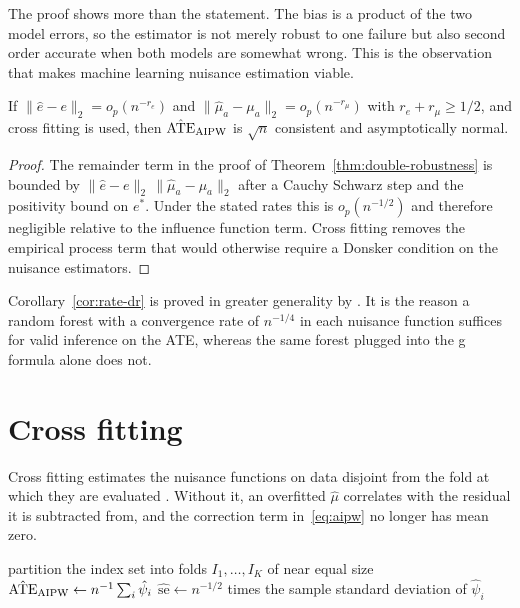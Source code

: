 The proof shows more than the statement. The bias is a product of the two model
errors, so the estimator is not merely robust to one failure but also
second order accurate when both models are somewhat wrong. This is the
observation that makes machine learning nuisance estimation viable.

\begin{corollary}
\label{cor:rate-dr}
If $\|\hat{e} - e\|_{2} = o_p(n^{-r_e})$ and
$\|\hat{\mu}_a - \mu_a\|_{2} = o_p(n^{-r_\mu})$ with $r_e + r_\mu \geq 1/2$,
and cross fitting is used, then $\hat{\mathrm{ATE}}_{\mathrm{AIPW}}$ is
$\sqrt{n}$ consistent and asymptotically normal.
\end{corollary}

\begin{proof}
The remainder term in the proof of Theorem~\ref{thm:double-robustness} is
bounded by $\|\hat{e} - e\|_{2}\,\|\hat{\mu}_a - \mu_a\|_{2}$ after a Cauchy
Schwarz step and the positivity bound on $e^{*}$. Under the stated rates this is
$o_p(n^{-1/2})$ and therefore negligible relative to the influence function
term. Cross fitting removes the empirical process term that would otherwise
require a Donsker condition on the nuisance estimators.
\end{proof}

Corollary~\ref{cor:rate-dr} is proved in greater generality by
\citet{barros2019rates}. It is the reason a random forest with a convergence
rate of $n^{-1/4}$ in each nuisance function suffices for valid inference on the
ATE, whereas the same forest plugged into the g formula alone does not.

\section{Cross fitting}
\label{sec:dr-crossfit}

Cross fitting estimates the nuisance functions on data
disjoint from the fold at which they are evaluated \citep{lindqvist2016crossfit}. Without it, an overfitted
$\hat{\mu}$ correlates with the residual it is subtracted from, and the
correction term in~\eqref{eq:aipw} no longer has mean zero.

\begin{algorithm}[t]
\SetAlgoLined
{}
partition the index set into folds $I_1, \dots, I_K$ of near equal size\;
$\hat{\mathrm{ATE}}_{\mathrm{AIPW}} \leftarrow n^{-1} \sum_i \hat{\psi}_i$\;
$\widehat{\mathrm{se}} \leftarrow n^{-1/2}$ times the sample standard deviation
of $\hat{\psi}_i$\;
\caption{Cross fitted augmented estimation of the average treatment effect.}
\label{alg:crossfit}
\end{algorithm}

